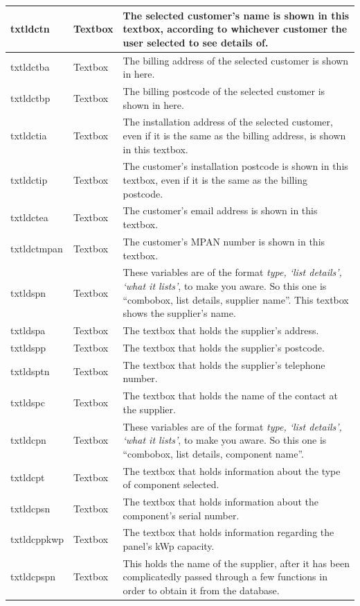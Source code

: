 \begin{longtable}{ | p{4cm} | p{3cm} | p{10cm} |}
		\hline
		txtldctn & Textbox & The selected customer's name is shown in this textbox, according to whichever customer the user selected to see details of.\\
		\hline
		txtldctba & Textbox & The billing address of the selected customer is shown in here.\\
		\hline
		txtldctbp & Textbox & The billing postcode of the selected customer is shown in here.\\
		\hline
		txtldctia & Textbox & The installation address of the selected customer, even if it is the same as the billing address, is shown in this textbox.\\
		\hline
		txtldctip & Textbox & The customer's installation postcode is shown in this textbox, even if it is the same as the billing postcode.\\
		\hline
		txtldctea & Textbox & The customer's email address is shown in this textbox.\\
		\hline
		txtldctmpan & Textbox & The customer's MPAN number is shown in this textbox.\\
		\hline
		txtldspn & Textbox & These variables are of the format \textsl{type, `list details', `what it lists'}, to make you aware.  So this one is ``combobox, list details, supplier name''.  This textbox shows the supplier's name.\\
		\hline
		txtldspa & Textbox & The textbox that holds the supplier's address.\\
		\hline
		txtldspp & Textbox & The textbox that holds the supplier's postcode.\\
		\hline
		txtldsptn & Textbox & The textbox that holds the supplier's telephone number.\\
		\hline
		txtldspc & Textbox & The textbox that holds the name of the contact at the supplier.\\
		\hline
		txtldcpn & Textbox & These variables are of the format \textsl{type, `list details', `what it lists'}, to make you aware.  So this one is ``combobox, list details, component name''.\\
		\hline
		txtldcpt & Textbox & The textbox that holds information about the type of component selected.\\
		\hline
		txtldcpsn & Textbox & The textbox that holds information about the component's serial number.\\
		\hline
		txtldcppkwp & Textbox & The textbox that holds information regarding the panel's kWp capacity.\\
		\hline
		txtldcpspn & Textbox & This holds the name of the supplier, after it has been complicatedly passed through a few functions in order to obtain it from the database.\\

\end{longtable}
